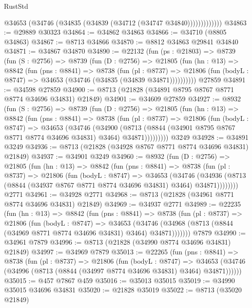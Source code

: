 \begin{lexlean}{RustStd}
\begin{coremodule}
                  @34653 (@34746 (@34835 (@34839 (@34712 (@34747 @34840)))))))))))))
@34863 := @29889 @30323
@34864 := @34862 @34863
@34866 := @34710 (@8805 @34863)
@34867 := @8713 @34866
@34870 := @8812 @34863 @29841 @34840
@34871 := @34867 @34870
@34890 := @22132
    (fun (ps : @21803) =>
    @8739
      (fun (S : @2756) =>
      @8739
        (fun (D : @2756) =>
        @21805
          (fun (hn : @13) =>
          @8842
            (fun (pns : @8841) =>
            @8738
              (fun (pl : @8737) =>
              @21806 (fun (bodyL : @8747) => @34653 (@34746 (@34835 (@34839 @34871))))))))))
    @27859
@34891 := @34598 @27859
@34900 := @8713 (@21828 (@34891 @8795 @8767 @8771 @8774 @34696 @34831) @21849)
@34901 := @34609 @27859
@34927 := @8932
    (fun (S : @2756) =>
    @8739
      (fun (D : @2756) =>
      @21805
        (fun (hn : @13) =>
        @8842
          (fun (pns : @8841) =>
          @8738
            (fun (pl : @8737) =>
            @21806
              (fun (bodyL : @8747) =>
              @34653
                (@34746
                  (@34900
                    (@8713
                      (@8844 (@34901 @8795 @8767 @8771 @8774 @34696 @34831) @3464)
                      @34871)))))))))
    @3249
@34928 := @34891 @3249
@34936 := @8713 (@21828 (@34928 @8767 @8771 @8774 @34696 @34831) @21849)
@34937 := @34901 @3249
@34960 := @8932
    (fun (D : @2756) =>
    @21805
      (fun (hn : @13) =>
      @8842
        (fun (pns : @8841) =>
        @8738
          (fun (pl : @8737) =>
          @21806
            (fun (bodyL : @8747) =>
            @34653
              (@34746
                (@34936 (@8713 (@8844 (@34937 @8767 @8771 @8774 @34696 @34831) @3464) @34871))))))))
    @2771
@34961 := @34928 @2771
@34968 := @8713 (@21828 (@34961 @8771 @8774 @34696 @34831) @21849)
@34969 := @34937 @2771
@34989 := @22235
    (fun (hn : @13) =>
    @8842
      (fun (pns : @8841) =>
      @8738
        (fun (pl : @8737) =>
        @21806
          (fun (bodyL : @8747) =>
          @34653
            (@34746 (@34968 (@8713 (@8844 (@34969 @8771 @8774 @34696 @34831) @3464) @34871)))))))
    @7879
@34990 := @34961 @7879
@34996 := @8713 (@21828 (@34990 @8774 @34696 @34831) @21849)
@34997 := @34969 @7879
@35013 := @22265
    (fun (pns : @8841) =>
    @8738
      (fun (pl : @8737) =>
      @21806
        (fun (bodyL : @8747) =>
        @34653 (@34746 (@34996 (@8713 (@8844 (@34997 @8774 @34696 @34831) @3464) @34871))))))
@35015 := @457 @7867 @459
@35016 := @35013 @35015
@35019 := @34990 @35015 @34696 @34831
@35020 := @21828 @35019
@35022 := @8713 (@35020 @21849)

\end{coremodule}
\end{lexlean}
